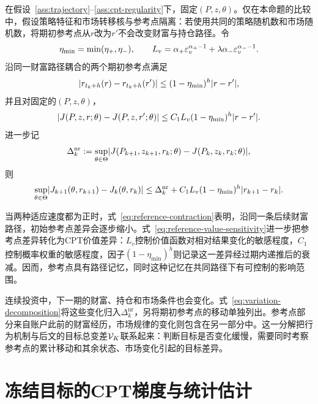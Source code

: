\begin{proposition}[参考点敏感性]\label{prop:reference-sensitivity}
在假设~\ref{ass:trajectory}--\ref{ass:cpt-regularity}下，固定$(P,z,\theta)$。仅在本命题的比较中，假设策略特征和市场转移核与参考点隔离：若使用共同的策略随机数和市场随机数，将期初参考点从$r$改为$r'$不会改变财富与持仓路径。令
\begin{equation}\label{eq:reference-constants}
 \eta_{\min}=\min(\eta_{+},\eta_{-}),
 \qquad
 L_v=\alpha_+\varepsilon_v^{\alpha_+-1}
 +\lambda\alpha_-\varepsilon_v^{\alpha_--1}.
\end{equation}
沿同一财富路径耦合的两个期初参考点满足
\begin{equation}\label{eq:reference-contraction}
 \lvert r_{t_k+h}(r)-r_{t_k+h}(r')\rvert
 \le(1-\eta_{\min})^h\lvert r-r'\rvert,
\end{equation}
并且对固定的$(P,z,\theta)$，
\begin{equation}\label{eq:reference-value-sensitivity}
 \lvert J(P,z,r;\theta)-J(P,z,r';\theta)\rvert
 \le C_1L_v(1-\eta_{\min})^h\lvert r-r'\rvert.
\end{equation}
进一步记
\[
 \Delta_k^{\mathrm{nr}}
 :=\sup_{\theta\in\Theta}
 \lvert J(P_{k+1},z_{k+1},r_k;\theta)-J(P_k,z_k,r_k;\theta)\rvert,
\]
则
\begin{equation}\label{eq:variation-decomposition}
 \sup_{\theta\in\Theta}
 \lvert J_{k+1}(\theta,r_{k+1})-J_k(\theta,r_k)\rvert
 \le \Delta_k^{\mathrm{nr}}
 +C_1L_v(1-\eta_{\min})^h\lvert r_{k+1}-r_k\rvert.
\end{equation}
\end{proposition}

当两种适应速度都为正时，式~\eqref{eq:reference-contraction}表明，沿同一条后续财富路径，初始参考点差异会逐步缩小。式~\eqref{eq:reference-value-sensitivity}进一步把参考点差异转化为CPT价值差异：$L_v$控制价值函数对相对结果变化的敏感程度，$C_1$控制概率权重的敏感程度，因子$(1-\eta_{\min})^h$则记录这一差异经过期内递推后的衰减。因而，参考点具有路径记忆，同时这种记忆在共同路径下有可控制的影响范围。

连续投资中，下一期的财富、持仓和市场条件也会变化。式~\eqref{eq:variation-decomposition}将这些变化归入$\Delta_k^{\mathrm{nr}}$，另将期初参考点的移动单独列出。参考点部分来自账户此前的财富经历，市场规律的变化则包含在另一部分中。这一分解把行为机制与后文的目标总变差$\mathcal V_K$联系起来：判断目标是否变化缓慢，需要同时考察参考点的累计移动和其余状态、市场变化引起的目标差异。

\section{冻结目标的CPT梯度与统计估计}

